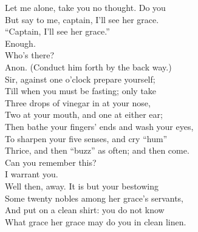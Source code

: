 \documentclass[a4paper,oneside,12pt]{memoir}
\begin{document}
\begin{drama*}
\facespeaks Let me alone, take you no thought. Do you\\
But say to me, captain, I'll see her grace.\\
\dapperspeaks ``Captain, I'll see her grace.''\\
\facespeaks {} Enough.\\
\subtlespeaks {} Who's there?\\
Anon. (Conduct him forth by the back way.)\\
Sir, against one o'clock prepare yourself;\\
Till when you must be fasting; only take\\
Three drops of vinegar in at your nose,\\
Two at your mouth, and one at either ear;\\
Then bathe your fingers' ends and wash your eyes,\\
To sharpen your five senses, and cry ``hum''\\
Thrice, and then ``buzz'' as often; and then come.\\
\facespeaks Can you remember this?\\
\dapperspeaks {} I warrant you.\\
\facespeaks Well then, away. It is but your bestowing\\
Some twenty nobles among her grace's servants,\\
And put on a clean shirt: you do not know\\
What grace her grace may do you in clean linen.\\

\scene


\end{drama*}
\end{document}
